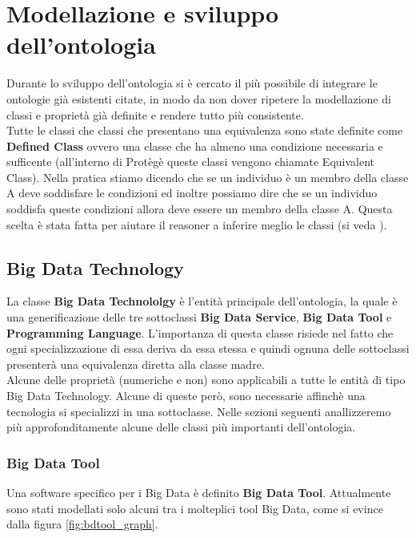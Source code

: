 \chapter{Modellazione e sviluppo dell'ontologia}
Durante lo sviluppo dell'ontologia si è cercato il più possibile di integrare le ontologie già esistenti citate, in modo da non dover ripetere la modellazione di classi e proprietà già definite e rendere tutto più consistente.\\

Tutte le classi che classi che presentano una equivalenza sono state definite come \textbf{Defined Class} ovvero una classe che ha almeno una condizione necessaria e sufficente (all'interno di Protègè queste classi vengono chiamate Equivalent Class). Nella pratica stiamo dicendo che se un individuo è un membro della classe A deve soddisfare le condizioni ed inoltre possiamo dire che se un individuo soddisfa queste condizioni allora deve essere un membro della classe A. Questa scelta è stata fatta per aiutare il reasoner a inferire meglio le classi (si veda \cite{definedclass}).

\section{Big Data Technology}
La classe \textbf{Big Data Technololgy} è l'entità principale dell'ontologia, la quale è una generificazione delle tre sottoclassi \textbf{Big Data Service}, \textbf{Big Data Tool} e \textbf{Programming Language}. L'importanza di questa classe risiede nel fatto che ogni specializzazione di essa deriva da essa stessa e quindi ognuna delle sottoclassi presenterà una equivalenza diretta alla classe madre.\\

Alcune delle proprietà (numeriche e non) sono applicabili a tutte le entità di tipo Big Data Technology. Alcune di queste però, sono necessarie affinchè una tecnologia si specializzi in una sottoclasse. Nelle sezioni seguenti anallizzeremo più approfonditamente alcune delle classi più importanti dell'ontologia.
\newpage
\subsection{Big Data Tool}
Una software specifico per i Big Data è definito \textbf{Big Data Tool}. Attualmente sono stati modellati solo alcuni tra i molteplici tool Big Data, come si evince dalla figura \ref{fig:bdtool_graph}.

